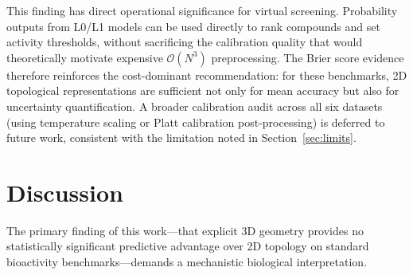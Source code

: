 \documentclass[pdflatex,sn-vancouver-num]{sn-jnl}%
\theoremstyle{thmstyleone}%
\theoremstyle{thmstyletwo}%
\theoremstyle{thmstylethree}%
\begin{document}
This finding has direct operational significance for virtual screening.  Probability outputs from L0/L1 models can be used directly to rank compounds and set activity thresholds, without sacrificing the calibration quality that would theoretically motivate expensive $\mathcal{O}(N^3)$ preprocessing.  The Brier score evidence therefore reinforces the cost-dominant recommendation: for these benchmarks, 2D topological representations are sufficient not only for mean accuracy but also for uncertainty quantification.  A broader calibration audit across all six datasets (using temperature scaling or Platt calibration post-processing) is deferred to future work, consistent with the limitation noted in Section~\ref{sec:limits}.


\section{Discussion}
\label{sec:discussion}

The primary finding of this work---that explicit 3D geometry provides no statistically significant predictive advantage over 2D topology on standard bioactivity benchmarks---demands a mechanistic biological interpretation. 
\end{document}
